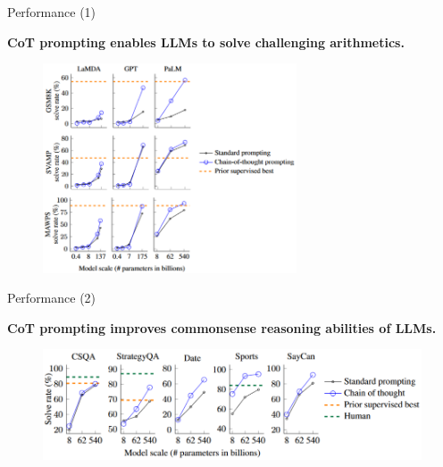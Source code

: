 \begin{vbframe}{Performance (1)}

\vfill

\textbf{CoT prompting enables LLMs to solve challenging arithmetics.}

\begin{figure}
    \centering
    \includegraphics[width=0.67\textwidth]{figure/cot_performance1.png}\\
\end{figure}

\vfill

\end{vbframe}


\begin{vbframe}{Performance (2)}

\vfill

\textbf{CoT prompting improves commonsense reasoning abilities of LLMs.}

\begin{figure}
    \centering
    \includegraphics{figure/cot_performance2.png}\\
\end{figure}

\vfill

\end{vbframe}

